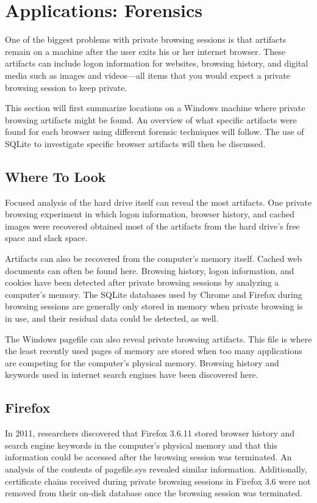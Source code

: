 \documentclass[pdftex,letterpaper,titlepage,12pt]{article}
\begin{document}
  \section{Applications: Forensics}
  One of the biggest problems with private browsing sessions is that artifacts
  remain on a machine after the user exits his or her internet browser. These
  artifacts can include logon information for websites, browsing history,
  and digital media such as images and videos---all items that you would expect
  a private browsing session to keep private.\cite{ohana13}

  This section will first summarize locations on a Windows machine where
  private browsing artifacts might be found. An overview of what specific
  artifacts were found for each browser using different forensic techniques
  will follow. The use of SQLite to investigate specific browser artifacts will
  then be discussed.

    \subsection{Where To Look}
    Focused analysis of the hard drive itself can reveal the most artifacts.
    One private browsing experiment in which logon information, browser
    history, and cached images were recovered obtained most of the artifacts
    from the hard drive's free space and slack space.\cite{ohana13}

    Artifacts can also be recovered from the computer's memory itself. Cached
    web documents can often be found here.\cite{ohana13} Browsing history,
    logon information, and cookies have been detected after private browsing
    sessions by analyzing a computer's memory. The SQLite databases used by 
    Chrome and Firefox during browsing sessions are generally only stored in 
    memory when private browsing is in use, and their residual data could be 
    detected, as well.\cite{satvat13}

    The Windows pagefile can also reveal private browsing artifacts. This file
    is where the least recently used pages of memory are stored when too many
    applications are competing for the computer's physical memory. Browsing
    history and keywords used in internet search engines have been discovered
    here.\cite{said11}

    \subsection{Firefox}
	In 2011, researchers discovered that Firefox 3.6.11 stored browser history
	and search engine keywords in the computer's physical memory and that this
	information could be accessed after the browsing session was terminated.
	An analysis of the contents of pagefile.sys revealed similar information.
	\cite{said11} Additionally, certificate chains received during private 
	browsing sessions in Firefox 3.6 were not removed from their on-disk 
	database once the browsing session was terminated. 
\end{document}
